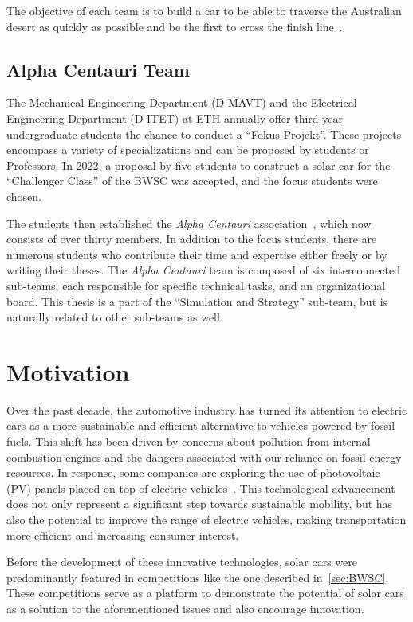 The objective of each team is to build a car to be able to traverse the Australian desert as quickly as possible and be the first to cross the finish line~\cite{onTheSubjectOfSolarVehicles:2007}.


\subsection{Alpha Centauri Team}
The Mechanical Engineering Department (D-MAVT) and the Electrical Engineering Department (D-ITET) at ETH annually offer third-year undergraduate students the chance to conduct a \enquote{Fokus Projekt}. These projects encompass a variety of specializations and can be proposed by students or Professors. In 2022, a proposal by five students to construct a solar car for the \enquote{Challenger Class} of the BWSC was accepted, and the focus students were chosen.

The students then established the \textit{Alpha Centauri} association~\cite{alphaCentauri:2022webpage}, which now consists of over thirty members. In addition to the focus students, there are numerous students who contribute their time and expertise either freely or by writing their theses. The \textit{Alpha Centauri} team is composed of six interconnected sub-teams, each responsible for specific technical tasks, and an organizational board. This thesis is a part of the \enquote{Simulation and Strategy} sub-team, but is naturally related to other sub-teams as well.


\section{Motivation}
Over the past decade, the automotive industry has turned its attention to electric cars as a more sustainable and efficient alternative to vehicles powered by fossil fuels. This shift has been driven by concerns about pollution from internal combustion engines and the dangers associated with our reliance on fossil energy resources. In response, some companies are exploring the use of photovoltaic (PV) panels placed on top of electric vehicles~\cite{lightyear:2022webpage, sion:2022webpage, Fraunhofer:2022webpage}. This technological advancement does not only represent a significant step towards sustainable mobility, but has also the potential to improve the range of electric vehicles, making transportation more efficient and increasing consumer interest.

Before the development of these innovative technologies, solar cars were predominantly featured in competitions like the one described in~\cref{sec:BWSC}. These competitions serve as a platform to demonstrate the potential of solar cars as a solution to the aforementioned issues and also encourage innovation.

